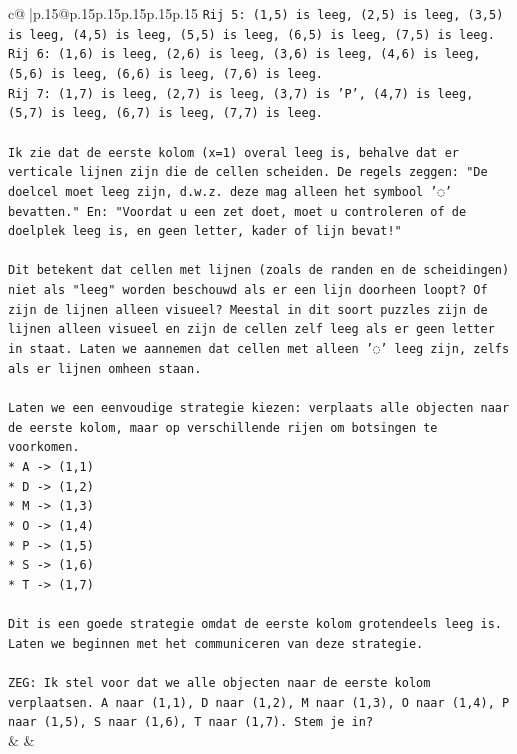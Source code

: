 \documentclass{article}
\begin{document}
{\begin{supertabular}{c@{$\;$}|p{.15\linewidth}@{}p{.15\linewidth}p{.15\linewidth}p{.15\linewidth}p{.15\linewidth}p{.15\linewidth}}
{{{\texttt{Rij 5: (1,5) is leeg, (2,5) is leeg, (3,5) is leeg, (4,5) is leeg, (5,5) is leeg, (6,5) is leeg, (7,5) is leeg.} \\
\texttt{Rij 6: (1,6) is leeg, (2,6) is leeg, (3,6) is leeg, (4,6) is leeg, (5,6) is leeg, (6,6) is leeg, (7,6) is leeg.} \\
\texttt{Rij 7: (1,7) is leeg, (2,7) is leeg, (3,7) is 'P', (4,7) is leeg, (5,7) is leeg, (6,7) is leeg, (7,7) is leeg.} \\
\\ 
\texttt{Ik zie dat de eerste kolom (x=1) overal leeg is, behalve dat er verticale lijnen zijn die de cellen scheiden. De regels zeggen: "De doelcel moet leeg zijn, d.w.z. deze mag alleen het symbool '◌' bevatten." En: "Voordat u een zet doet, moet u controleren of de doelplek leeg is, en geen letter, kader of lijn bevat!"} \\
\\ 
\texttt{Dit betekent dat cellen met lijnen (zoals de randen en de scheidingen) niet als "leeg" worden beschouwd als er een lijn doorheen loopt? Of zijn de lijnen alleen visueel? Meestal in dit soort puzzles zijn de lijnen alleen visueel en zijn de cellen zelf leeg als er geen letter in staat. Laten we aannemen dat cellen met alleen '◌' leeg zijn, zelfs als er lijnen omheen staan.} \\
\\ 
\texttt{Laten we een eenvoudige strategie kiezen: verplaats alle objecten naar de eerste kolom, maar op verschillende rijen om botsingen te voorkomen.} \\
\texttt{*   A {-}> (1,1)} \\
\texttt{*   D {-}> (1,2)} \\
\texttt{*   M {-}> (1,3)} \\
\texttt{*   O {-}> (1,4)} \\
\texttt{*   P {-}> (1,5)} \\
\texttt{*   S {-}> (1,6)} \\
\texttt{*   T {-}> (1,7)} \\
\\ 
\texttt{Dit is een goede strategie omdat de eerste kolom grotendeels leeg is. Laten we beginnen met het communiceren van deze strategie.} \\
\\ 
\texttt{ZEG: Ik stel voor dat we alle objecten naar de eerste kolom verplaatsen. A naar (1,1), D naar (1,2), M naar (1,3), O naar (1,4), P naar (1,5), S naar (1,6), T naar (1,7). Stem je in?} \\
            }
        }
    }
    & & \\ \\


\end{supertabular}}
\end{document}
